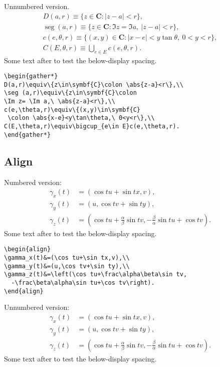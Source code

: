 \documentclass{article}
\theoremstyle{definition}
\theoremstyle{remark}
\DeclareMathOperator{\seg}{seg}
\newcommand{\envert}[1]{\left\lvert#1\right\rvert}
\let\abs=\envert
\begin{document}
Unnumbered version.
\begin{gather*}
D(a,r)\equiv\{z\in\symbf{C}\colon \abs{z-a}<r\},\\
\seg (a,r)\equiv\{z\in\symbf{C}\colon
\Im z= \Im a,\ \abs{z-a}<r\},\\
c(e,\theta,r)\equiv\{(x,y)\in\symbf{C}
 \colon \abs{x-e}<y\tan\theta,\ 0<y<r\},\\
C(E,\theta,r)\equiv\bigcup_{e\in E}c(e,\theta,r).
\end{gather*}
Some text after to test the below-display spacing.
\begin{verbatim}
\begin{gather*}
D(a,r)\equiv\{z\in\symbf{C}\colon \abs{z-a}<r\},\\
\seg (a,r)\equiv\{z\in\symbf{C}\colon
\Im z= \Im a,\ \abs{z-a}<r\},\\
c(e,\theta,r)\equiv\{(x,y)\in\symbf{C}
 \colon \abs{x-e}<y\tan\theta,\ 0<y<r\},\\
C(E,\theta,r)\equiv\bigcup_{e\in E}c(e,\theta,r).
\end{gather*}
\end{verbatim}

\newpage
\subsection{Align}
Numbered version:
\begin{align}
\gamma_x(t)&=(\cos tu+\sin tx,v),\\
\gamma_y(t)&=(u,\cos tv+\sin ty),\\
\gamma_z(t)&=\left(\cos tu+\frac\alpha\beta\sin tv,
  -\frac\beta\alpha\sin tu+\cos tv\right).
\end{align}
Some text after to test the below-display spacing.

\begin{verbatim}
\begin{align}
\gamma_x(t)&=(\cos tu+\sin tx,v),\\
\gamma_y(t)&=(u,\cos tv+\sin ty),\\
\gamma_z(t)&=\left(\cos tu+\frac\alpha\beta\sin tv,
  -\frac\beta\alpha\sin tu+\cos tv\right).
\end{align}
\end{verbatim}

Unnumbered version:
\begin{align*}
\gamma_x(t)&=(\cos tu+\sin tx,v),\\
\gamma_y(t)&=(u,\cos tv+\sin ty),\\
\gamma_z(t)&=\left(\cos tu+\frac\alpha\beta\sin tv,
  -\frac\beta\alpha\sin tu+\cos tv\right).
\end{align*}
Some text after to test the below-display spacing.
\end{document}
